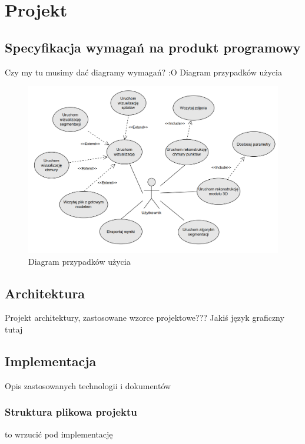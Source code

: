 \section{Projekt}
\subsection{Specyfikacja wymagań na produkt programowy}
Czy my tu musimy dać diagramy wymagań? :O
Diagram przypadków użycia

\begin{figure}[!htb]
  \includegraphics[width=\linewidth]{img/diagram_pu_3.png}
  \caption{Diagram przypadków użycia}\label{fig:use_case_diagram}
\end{figure}

\subsection{Architektura}
Projekt architektury, zastosowane wzorce projektowe???
Jakiś język graficzny tutaj

\subsection{Implementacja}
Opis zastosowanych technologii i dokumentów

\subsubsection{Struktura plikowa projektu}

to wrzucić pod implementację


